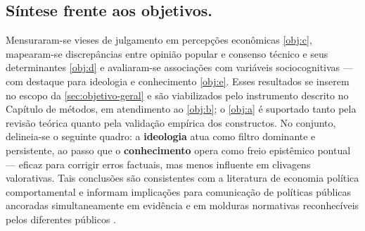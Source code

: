 \subsection{Síntese frente aos objetivos.}
Mensuraram-se vieses de julgamento em percepções econômicas \autoref{obj:c}, mapearam-se discrepâncias entre opinião popular e consenso técnico e seus determinantes \autoref{obj:d} e avaliaram-se associações com variáveis sociocognitivas — com destaque para ideologia e conhecimento \autoref{obj:e}. Esses resultados se inserem no escopo da \autoref{sec:objetivo-geral} e são viabilizados pelo instrumento descrito no Capítulo de métodos, em atendimento ao \autoref{obj:b}; o \autoref{obj:a} é suportado tanto pela revisão teórica quanto pela validação empírica dos constructos. No conjunto, delineia-se o seguinte quadro: a \textbf{ideologia} atua como filtro dominante e persistente, ao passo que o \textbf{conhecimento} opera como freio epistêmico pontual — eficaz para corrigir erros factuais, mas menos influente em clivagens valorativas. Tais conclusões são consistentes com a literatura de economia política comportamental e informam implicações para comunicação de políticas públicas ancoradas simultaneamente em evidência e em molduras normativas reconhecíveis pelos diferentes públicos \cite{kahneman2011thinking, kahan2012polarization, Systematically_Biased_Beliefs_about_Economics}.
